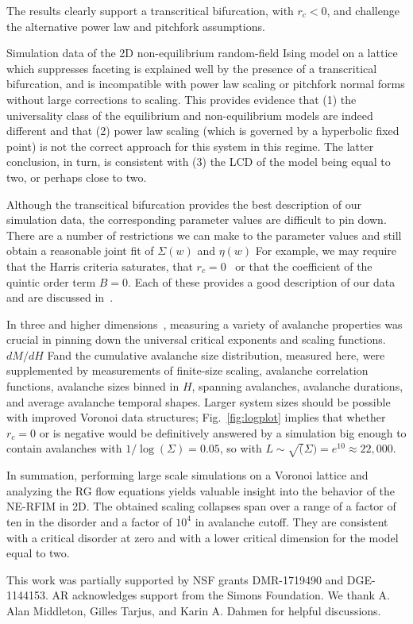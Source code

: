 \documentclass[reprint,amsmath,amssymb,aps,floatfix, prl]{revtex4-1}
\begin{document}
%
\noindent The results clearly support a transcritical bifurcation, with $r_c<0$, and challenge the alternative power law and pitchfork assumptions.\par
%
Simulation data of the 2D non-equilibrium random-field Ising model on a lattice which suppresses faceting is explained well by the presence of a transcritical bifurcation, and is incompatible with power law scaling or pitchfork normal forms without large corrections to scaling. This provides evidence that (1) the universality class of the equilibrium and non-equilibrium models are indeed different and that (2) power law scaling (which is governed by a hyperbolic fixed point) is not the correct approach for this system in this regime. The latter conclusion, in turn, is consistent with (3) the LCD of the model being equal to two, or perhaps close to two.   \par
%
Although the transcitical bifurcation provides the best description of our simulation data, the corresponding parameter values are difficult to pin down. There are a number of restrictions we can make to the parameter values and still obtain a reasonable joint fit of $\Sigma(w)$ and $\eta(w)$ For example, we may require that the Harris criteria saturates, that $r_c=0$~\cite{Perkovic96} or that the coefficient of the quintic order term $B=0$. Each of these provides a good description of our data and are discussed in~\cite{RFIM2Dsupp}. \par
%
In three and higher dimensions~\cite{Perkovic96,Kuntz00}, measuring a
variety of avalanche properties was crucial in pinning down the
universal critical exponents and scaling functions. $dM/dH$ Fand the
cumulative avalanche size distribution, measured here, were supplemented by
measurements of finite-size scaling, avalanche correlation functions,
avalanche sizes binned in $H$, spanning avalanches, avalanche durations,
and average avalanche temporal shapes. Larger system sizes should be possible
with improved Voronoi data structures; Fig.~\ref{fig:logplot} implies that
whether $r_c=0$ or is negative would be definitively answered by a simulation
big enough to contain avalanches with $1/\log(\Sigma) = 0.05$, so with
$L \sim \sqrt(\Sigma) = e^{10} \approx 22,000$.\par
%
In summation, performing large scale simulations on a Voronoi lattice and analyzing the RG flow equations yields valuable insight into the behavior of the NE-RFIM in 2D. The obtained scaling collapses span over a range of a factor of ten in the disorder and a factor of $10^4$ in avalanche cutoff. They are consistent with a critical disorder at zero and with a lower critical dimension for the model equal to two. \par
%
This work was partially supported by NSF grants  DMR-1719490 and DGE-1144153. AR acknowledges support from the Simons Foundation. We thank A. Alan Middleton, Gilles Tarjus, and Karin A. Dahmen for helpful discussions. 

{}
\end{document}
